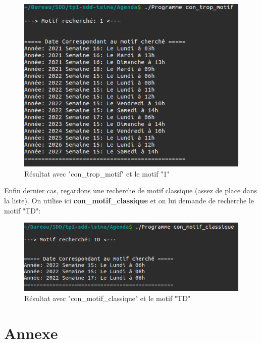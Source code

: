 \documentclass[12pt,french]{article} %
\begin{document}
\begin{figure}[H]
	\includegraphics[scale=0.6]{co-tm.png}
	\centering
	\caption{Résultat avec "con\_trop\_motif" et le motif "1"}
\end{figure}

Enfin dernier cas, regardons une recherche de motif classique (assez de place dans la liste). On utilise ici \textbf{con\_motif\_classique} et on lui demande de recherche le motif "TD":

\begin{figure}[H]
	\includegraphics[scale=0.6]{co-mc.png}
	\centering
	\caption{Résultat avec "con\_motif\_classique" et le motif "TD"}
\end{figure}


\newpage
\section{Annexe}
\listoffigures
\end{document}
